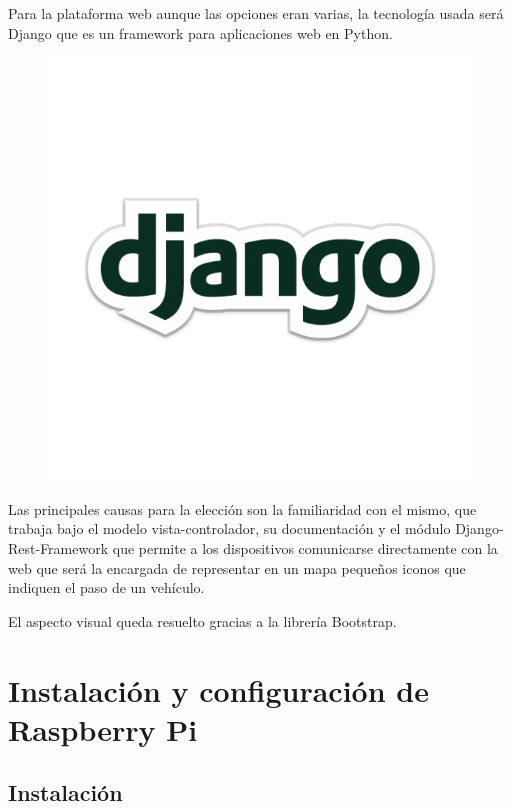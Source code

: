 Para la plataforma web aunque las opciones eran varias, la tecnología usada será Django que es un framework para aplicaciones web en Python.

\begin{figure}[!ht]
  \begin{center}
    \includegraphics[scale=0.1]{../images/web/django-logo.png}
    \label{fig:drflog}
	\end{center}
\end{figure}

Las principales causas para la elección son la familiaridad con el mismo, que trabaja bajo el modelo vista-controlador, su documentación y el módulo Django-Rest-Framework que permite a los dispositivos comunicarse directamente con la web que será la encargada de representar en un mapa pequeños iconos que indiquen el paso de un vehículo.

El aspecto visual queda resuelto gracias a la librería Bootstrap.

\section{Instalación y configuración de Raspberry Pi}

\subsection{Instalación}

